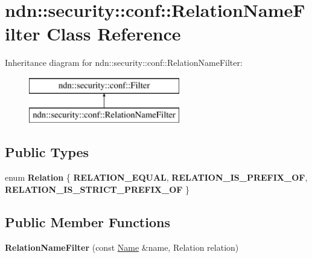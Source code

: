 \hypertarget{classndn_1_1security_1_1conf_1_1RelationNameFilter}{}\section{ndn\+:\+:security\+:\+:conf\+:\+:Relation\+Name\+Filter Class Reference}
\label{classndn_1_1security_1_1conf_1_1RelationNameFilter}
Inheritance diagram for ndn\+:\+:security\+:\+:conf\+:\+:Relation\+Name\+Filter\+:\begin{figure}[H]
\begin{center}
\leavevmode
\includegraphics[height=2.000000cm]{classndn_1_1security_1_1conf_1_1RelationNameFilter}
\end{center}
\end{figure}
\subsection*{Public Types}
\begin{DoxyCompactItemize}
\item 
enum {\bfseries Relation} \{ {\bfseries R\+E\+L\+A\+T\+I\+O\+N\+\_\+\+E\+Q\+U\+AL}, 
{\bfseries R\+E\+L\+A\+T\+I\+O\+N\+\_\+\+I\+S\+\_\+\+P\+R\+E\+F\+I\+X\+\_\+\+OF}, 
{\bfseries R\+E\+L\+A\+T\+I\+O\+N\+\_\+\+I\+S\+\_\+\+S\+T\+R\+I\+C\+T\+\_\+\+P\+R\+E\+F\+I\+X\+\_\+\+OF}
 \}\hypertarget{classndn_1_1security_1_1conf_1_1RelationNameFilter_a7e8fc3345b623a33d38834bc7e2dbf6f}{}\label{classndn_1_1security_1_1conf_1_1RelationNameFilter_a7e8fc3345b623a33d38834bc7e2dbf6f}

\end{DoxyCompactItemize}
\subsection*{Public Member Functions}
\begin{DoxyCompactItemize}
\item 
{\bfseries Relation\+Name\+Filter} (const \hyperlink{classndn_1_1Name}{Name} \&name, Relation relation)\hypertarget{classndn_1_1security_1_1conf_1_1RelationNameFilter_a0d44eb92f1fc85defae4843bfdd165fb}{}\label{classndn_1_1security_1_1conf_1_1RelationNameFilter_a0d44eb92f1fc85defae4843bfdd165fb}

\end{DoxyCompactItemize}
